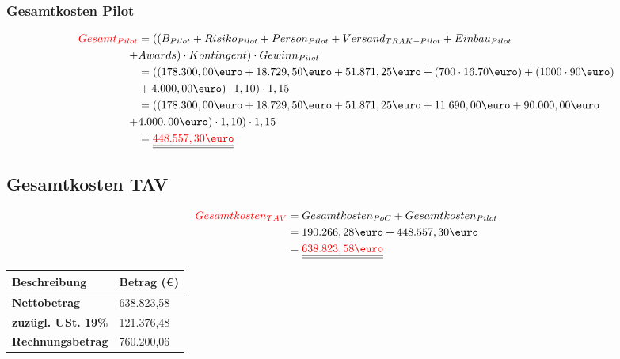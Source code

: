 \documentclass[a4paper,10pt]{scrartcl}
\begin{document}
\subsubsection{Gesamtkosten Pilot} %
\begin{equation}
\begin{split}
\textcolor{red}{Gesamt_{Pilot}} &= ((B_{Pilot} + Risiko_{Pilot} + Person_{Pilot} + Versand_{TRAK-Pilot} + Einbau_{Pilot}\\\
+& Awards) \cdot Kontingent) \cdot Gewinn_{Pilot} \\\
&= ((178.300,00\text{\euro} + 18.729,50\text{\euro} + 51.871,25\text{\euro} + (700 \cdot 16.70\text{\euro}) + (1000 \cdot 90\text{\euro})\\\
&+ 4.000,00\text{\euro}) \cdot 1,10 )\cdot 1,15\\\
&= ((178.300,00\text{\euro} + 18.729,50\text{\euro} + 51.871,25\text{\euro} + 11.690,00\text{\euro} + 90.000,00\text{\euro}\\\
+& 4.000,00\text{\euro}) \cdot 1,10) \cdot 1,15\\\
&= \underline{\underline{\textcolor{red}{448.557,30\text{\euro}}}}
\end{split}
\end{equation}

\subsection{Gesamtkosten TAV}
\begin{align}
\begin{split}
\textcolor{red}{Gesamtkosten_{TAV}} &= Gesamtkosten_{PoC} + Gesamtkosten_{Pilot}\\\
&= 190.266,28\text{\euro} + 448.557,30\text{\euro} \\\
&= \underline{\underline{\textcolor{red}{638.823,58\text{\euro}}}}
\end{split}
\end{align}

\begin{flushright}
\begin{tabular}{ll} 
\toprule
\textbf{Beschreibung} & \textbf{Betrag (\euro{})}\\
\midrule
\textbf{Nettobetrag}  & 638.823,58 \\
\textbf{zuzügl. USt. 19\%}  & 121.376,48 \\
\midrule
\rowcolor{pastelred}
\textbf{Rechnungsbetrag}  & 760.200,06 \\
\bottomrule
\end{tabular}
\end{flushright}
\end{document}
